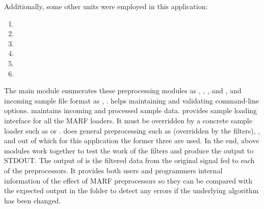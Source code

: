 Additionally, some other units were employed in this application:

\begin{enumerate}
\item
{}
\item
{}
\item
{}
\item
{}
\item
{}
\item
{}
\end{enumerate}

The main  module enumerates
these preprocessing modules as , , , and
, and incoming sample file format as , .  helps maintaining and
validating command-line options.  maintains incoming and processed sample data.  provides sample loading
interface for all the MARF loaders. It must be overridden by a concrete sample loader such as  or .
 does
general preprocessing such as  (overridden by the filters),
,  and  out of which
for this application the former three are used.
In the end, above modules work together to test the work of the filters and produce
the output to STDOUT.
The output of  is the filtered data from the original signal fed to each
of the preprocessors. It provides both users and programmers internal
information of the effect of MARF preprocessors so they can be compared with the
expected output in the  folder to detect any errors if the underlying
algorithm has been changed.
